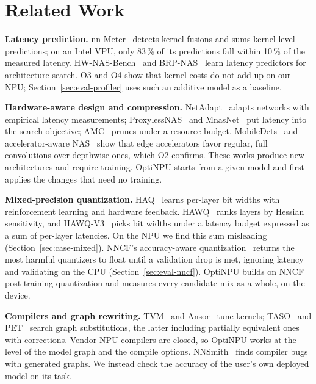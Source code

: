 \documentclass[conference]{IEEEtran}
\newcommand{\tool}{OptiNPU}
\begin{document}
\section{Related Work}

\textbf{Latency prediction.} nn-Meter~\cite{zhang2021nnmeter} detects kernel fusions and sums kernel-level predictions; on an Intel VPU, only 83\,\% of its predictions fall within 10\,\% of the measured latency. HW-NAS-Bench~\cite{li2021hwnasbench} and BRP-NAS~\cite{dudziak2020brpnas} learn latency predictors for architecture search. O3 and O4 show that kernel costs do not add up on our NPU; Section~\ref{sec:eval-profiler} uses such an additive model as a baseline.

\textbf{Hardware-aware design and compression.} NetAdapt~\cite{yang2018netadapt} adapts networks with empirical latency measurements; ProxylessNAS~\cite{cai2019proxylessnas} and MnasNet~\cite{tan2019mnasnet} put latency into the search objective; AMC~\cite{he2018amc} prunes under a resource budget. MobileDets~\cite{xiong2021mobiledets} and accelerator-aware NAS~\cite{gupta2020accelerator} show that edge accelerators favor regular, full convolutions over depthwise ones, which O2 confirms. These works produce new architectures and require training. \tool{} starts from a given model and first applies the changes that need no training.

\textbf{Mixed-precision quantization.} HAQ~\cite{wang2019haq} learns per-layer bit widths with reinforcement learning and hardware feedback. HAWQ~\cite{dong2019hawq} ranks layers by Hessian sensitivity, and HAWQ-V3~\cite{yao2021hawqv3} picks bit widths under a latency budget expressed as a sum of per-layer latencies. On the NPU we find this sum misleading (Section~\ref{sec:case-mixed}). NNCF's accuracy-aware quantization~\cite{kozlov2020nncf} returns the most harmful quantizers to float until a validation drop is met, ignoring latency and validating on the CPU (Section~\ref{sec:eval-nncf}). \tool{} builds on NNCF post-training quantization and measures every candidate mix as a whole, on the device.

\textbf{Compilers and graph rewriting.} TVM~\cite{chen2018tvm} and Ansor~\cite{zheng2020ansor} tune kernels; TASO~\cite{jia2019taso} and PET~\cite{wang2021pet} search graph substitutions, the latter including partially equivalent ones with corrections. Vendor NPU compilers are closed, so \tool{} works at the level of the model graph and the compile options. NNSmith~\cite{liu2023nnsmith} finds compiler bugs with generated graphs. We instead check the accuracy of the user's own deployed model on its task.
\end{document}
